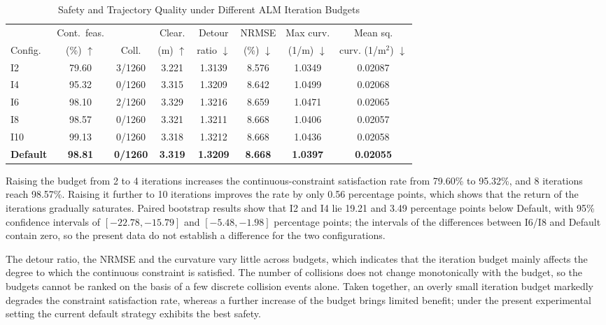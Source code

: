 \documentclass[journal]{IEEEtran}
\begin{document}
\begin{table}[!t]
\caption{Safety and Trajectory Quality under Different ALM Iteration Budgets}
\label{tab:budget}
\centering
\scriptsize
\setlength{\tabcolsep}{2.5pt}
\begin{tabular}{lccccccc}
\hline
 & Cont.\ feas. & & Clear. & Detour & NRMSE & Max curv. & Mean sq. \\
Config. & (\%) $\uparrow$ & Coll. & (m) $\uparrow$ & ratio $\downarrow$ &
(\%) $\downarrow$ & (1/m) $\downarrow$ & curv. (1/m$^2$) $\downarrow$ \\
\hline
I2  & 79.60 & 3/1260 & 3.221 & 1.3139 & 8.576 & 1.0349 & 0.02087 \\
I4  & 95.32 & 0/1260 & 3.315 & 1.3209 & 8.642 & 1.0499 & 0.02068 \\
I6  & 98.10 & 2/1260 & 3.329 & 1.3216 & 8.659 & 1.0471 & 0.02065 \\
I8  & 98.57 & 0/1260 & 3.321 & 1.3211 & 8.668 & 1.0406 & 0.02057 \\
I10 & 99.13 & 0/1260 & 3.318 & 1.3212 & 8.668 & 1.0436 & 0.02058 \\
\textbf{Default} & \textbf{98.81} & \textbf{0/1260} &
\textbf{3.319} & \textbf{1.3209} & \textbf{8.668} & \textbf{1.0397} &
\textbf{0.02055} \\
\hline
\end{tabular}
\end{table}

Raising the budget from 2 to 4 iterations increases the continuous-constraint
satisfaction rate from 79.60\% to 95.32\%, and 8 iterations reach 98.57\%.
Raising it further to 10 iterations improves the rate by only 0.56 percentage
points, which shows that the return of the iterations gradually saturates.
Paired bootstrap results show that I2 and I4 lie 19.21 and 3.49 percentage
points below Default, with 95\% confidence intervals of
$[-22.78,-15.79]$ and $[-5.48,-1.98]$ percentage points; the intervals of the
differences between I6/I8 and Default contain zero, so the present data do not
establish a difference for the two configurations.

The detour ratio, the NRMSE and the curvature vary little across budgets, which
indicates that the iteration budget mainly affects the degree to which the
continuous constraint is satisfied. The number of collisions does not change
monotonically with the budget, so the budgets cannot be ranked on the basis of a
few discrete collision events alone. Taken together, an overly small iteration
budget markedly degrades the constraint satisfaction rate, whereas a further
increase of the budget brings limited benefit; under the present experimental
setting the current default strategy exhibits the best safety.
\end{document}
